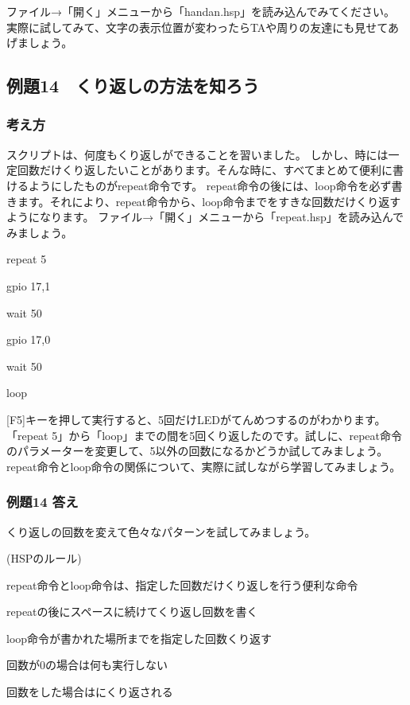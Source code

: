 ファイル→「開く」メニューから「handan.hsp」を読み込んでみてください。
実際に試してみて、文字の表示位置が変わったらTAや周りの友達にも見せてあげましょう。

\clearpage
\subsection{例題14　くり返しの方法を知ろう}

\subsubsection*{考え方}

スクリプトは、何度もくり返しができることを習いました。
しかし、時には一定回数だけくり返したいことがあります。そんな時に、すべてまとめて便利に書けるようにしたものがrepeat命令です。
repeat命令の後には、loop命令を必ず書きます。それにより、repeat命令から、loop命令までをすきな回数だけくり返すようになります。
ファイル→「開く」メニューから「repeat.hsp」を読み込んでみましょう。

\begin{description}
    \item repeat 5
    \item gpio 17,1
    \item wait 50
    \item gpio 17,0
    \item wait 50
    \item loop
\end{description}

[F5]キーを押して実行すると、5回だけLEDがてんめつするのがわかります。
「repeat
5」から「loop」までの間を5回くり返したのです。試しに、repeat命令のパラメーターを変更して、5以外の回数になるかどうか試してみましょう。
repeat命令とloop命令の関係について、実際に試しながら学習してみましょう。

\subsubsection*{例題14 答え}

くり返しの回数を変えて色々なパターンを試してみましょう。

\begin{description}
    \item (HSPのルール)
\end{description}

\begin{description}
    \item repeat命令とloop命令は、指定した回数だけくり返しを行う便利な命令
    \item repeatの後にスペースに続けてくり返し回数を書く
    \item loop命令が書かれた場所までを指定した回数くり返す
    \item 回数が0の場合は何も実行しない
    \item 回数をした場合はにくり返される
\end{description}

